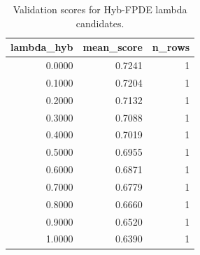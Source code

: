 \begin{table}[t]
\caption{Validation scores for Hyb-FPDE lambda candidates.}
\label{tab:lambda_distribution_computed}
\centering
\begin{tabular}{rrr}
\toprule
lambda\_hyb & mean\_score & n\_rows \\
\midrule
0.0000 & 0.7241 & 1 \\
0.1000 & 0.7204 & 1 \\
0.2000 & 0.7132 & 1 \\
0.3000 & 0.7088 & 1 \\
0.4000 & 0.7019 & 1 \\
0.5000 & 0.6955 & 1 \\
0.6000 & 0.6871 & 1 \\
0.7000 & 0.6779 & 1 \\
0.8000 & 0.6660 & 1 \\
0.9000 & 0.6520 & 1 \\
1.0000 & 0.6390 & 1 \\
\bottomrule
\end{tabular}

\end{table}
